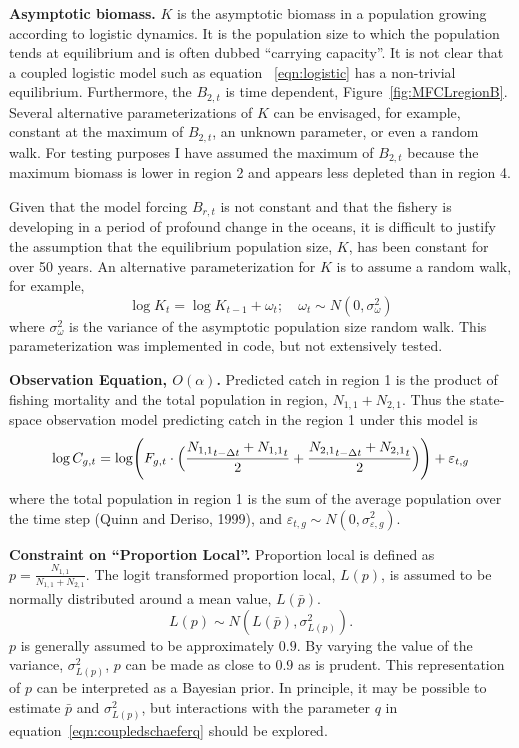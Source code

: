 \documentclass[12pt,letterpaper,twoside]{article}
\newcommand\None{{N_{1,1}}}
\newcommand\Ntwo{{N_{2,1}}}
\newcommand\Nsum{{N_{1,1}+N_{2,1}}}
\begin{document}
{\bf Asymptotic biomass.}
$K$ is the asymptotic biomass in a population growing according to
logistic dynamics. It is the population size to which the population
tends at equilibrium and is often dubbed ``carrying capacity''. 
It is not clear that a coupled logistic model such as equation~
\ref{eqn:logistic} has a non-trivial equilibrium. Furthermore, the
$B_{2,t}$ is time dependent, Figure~\ref{fig:MFCLregionB}.
Several alternative
parameterizations of $K$ can be envisaged, for example, constant at
the maximum of $B_{2,t}$, an unknown parameter, or even a random walk.
For testing purposes I have assumed the maximum of $B_{2,t}$ because
the maximum biomass is lower in region 2 and appears less depleted
than in region 4.

Given that the model forcing $B_{r,t}$ is not constant and that the
fishery is developing in a period of profound change in the oceans,
it is difficult to justify the assumption that the equilibrium
population size, $K$, has been constant for over 50 years. An
alternative parameterization for $K$ is to assume a random walk, for
example,
\begin{equation}
\log K_t = \log K_{t-1} + \omega_t;\quad \omega_t\sim
N(0,\sigma^2_\omega) \label{eqn:Kwalk}
\end{equation}
where  $\sigma^2_\omega$ is the variance of the
asymptotic population size random walk.
This parameterization was implemented in code, but not extensively
tested.

{\bf Observation Equation, $O(\alpha)$.}
Predicted catch in region 1 is the product of fishing mortality
and the total population in region, $\None+\Ntwo$.
Thus the state-space observation model predicting catch in the region 1
under this model is
\begin{equation}
\log C_{g,t} = \log \Biggl(F_{g,t}\cdot\Bigl(\frac{\None_{t-\Delta t}+\None_t}{2}
                           +\frac{\Ntwo_{t-\Delta
t}+\Ntwo_t}{2}\Bigr)\Biggr) + \varepsilon_{t,g}
\label{eqn:obs}
\end{equation}
where the total population in region 1 is the sum of the average
population over the time step (Quinn and Deriso, 1999), and
$\varepsilon_{t,g} \sim N(0,\sigma^2_{\varepsilon,g})$.

{\bf Constraint on ``Proportion Local''.}
Proportion local is defined as $p = \frac{\None}{\Nsum}$. The logit
transformed proportion local, $L(p)$, is assumed to be normally
distributed around a mean value, $L(\bar{p})$.
\begin{equation}
\label{eqn:LpropL}
L(p)\sim N(L(\bar{p}),\sigma^2_{L(p)}).
\end{equation} 
$p$ is generally assumed to be approximately $0.9$. By varying the
value of the variance, $\sigma^2_{L(p)}$, $p$ can be made as
close to $0.9$ as is prudent.
This representation of $p$ can be interpreted as a Bayesian prior.
In principle, it may be possible to
estimate $\bar{p}$ and $\sigma^2_{L(p)}$, but interactions with
the parameter $q$ in equation~\ref{eqn:coupledschaeferq} should be
explored.
\end{document}
